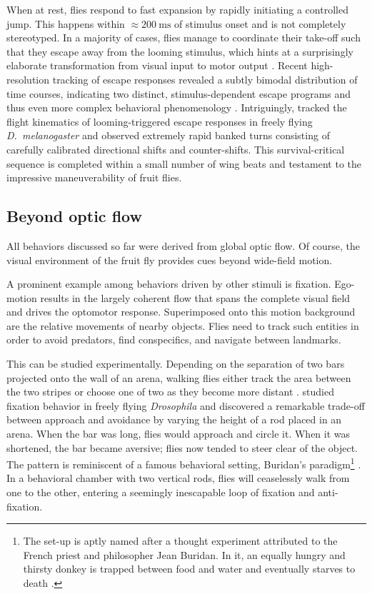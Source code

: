 When at rest, flies respond to fast expansion by rapidly initiating a controlled jump. This happens within $\approx\SI{200}{\milli\second}$ of stimulus onset and is not completely stereotyped. In a majority of cases, flies manage to coordinate their take-off such that they escape away from the looming stimulus, which hints at a surprisingly elaborate transformation from visual input to motor output \citep{Card:2008aa}. Recent high-resolution tracking of escape responses revealed a subtly bimodal distribution of time courses, indicating two distinct, stimulus-dependent escape programs and thus even more complex behavioral phenomenology \citep{Reyn:2014aa}. Intriguingly, \citet{Muijres:2014aa} tracked the flight kinematics of looming-triggered escape responses in freely flying \textit{D.\ melanogaster} and observed extremely rapid banked turns consisting of carefully calibrated directional shifts and counter-shifts. This survival-critical sequence is completed within a small number of wing beats and testament to the impressive maneuverability of fruit flies.

\subsection{Beyond optic flow}
All behaviors discussed so far were derived from global optic flow. Of course, the visual environment of the fruit fly provides cues beyond wide-field motion.

A prominent example among behaviors driven by other stimuli is fixation. Ego-motion results in the largely coherent flow that spans the complete visual field and drives the optomotor response. Superimposed onto this motion background are the relative movements of nearby objects. Flies need to track such entities in order to avoid predators, find conspecifics, and navigate between landmarks.

This can be studied experimentally. Depending on the separation of two bars projected onto the wall of an arena, walking flies either track the area between the two stripes or choose one of two as they become more distant \citep{Horn:1975aa}. \citet{Maimon:2008go} studied fixation behavior in freely flying \textit{Drosophila} and discovered a remarkable trade-off between approach and avoidance by varying the height of a rod placed in an arena. When the bar was long, flies would approach and circle it. When it was shortened, the bar became aversive; flies now tended to steer clear of the object. The pattern is reminiscent of a famous behavioral setting, Buridan's paradigm\footnote{The set-up is aptly named after a thought experiment attributed to the French priest and philosopher Jean Buridan. In it, an equally hungry and thirsty donkey is trapped between food and water and eventually starves to death \citep{Knowles}.} \citep{Buelthoff:1982aa}. In a behavioral chamber with two vertical rods, flies will ceaselessly walk from one to the other, entering a seemingly inescapable loop of fixation and anti-fixation.

